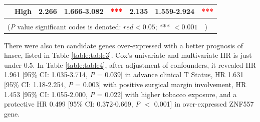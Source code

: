 \documentclass[jpm,article,submit,moreauthors,pdftex]{Definitions/mdpi}
\begin{document}
\begin{table}[hp]
{\begin{tabular}{|l|l|l|l|l|l|l|l|}
\cline{2-8}
                                        & High                                                                                & 2.266                                                                          & 1.666-3.082                                                                   & \multicolumn{1}{c|}{\textcolor{red}{***}}                                     & 2.135                                                                          & 1.559-2.924                                                                   & \multicolumn{1}{c|}{\textcolor{red}{***}}                                      \\ 
\hline
\multicolumn{8}{|l|}{}                                                                                                                                                                                                                                                                                                                                                                                                                                                                                                                                                                                                           \\ 
\hline
\multicolumn{8}{|l|}{(\textit{P} value significant codes is denoted: $red<0.05$; *** $<0.001$~~)}                                                                                                                                                                                                                                                                                                                                                                                                                                                                                                                                           \\
\hline
\end{tabular}
}
\label{table:table2}
\end{table}




There were also ten candidate genes over-expressed with a better prognosis of \acrshort{hnscc}, listed in Table \ref{table:table3}. Cox's univariate and multivariate HR is just under 0.5.
In Table \ref{table:table4},
after adjustment of confounders, it revealed HR 1.961 [95\% CI: 1.035-3.714, \textit{P} = 0.039] in advance clinical T Status, HR 1.631 [95\% CI: 1.18-2.254, \textit{P} = 0.003] with positive surgical margin involvement, HR 1.453 [95\% CI: 1.055-2.000, \textit{P} = 0.022] with higher tobacco exposure, and a protective HR 0.499 [95\% CI: 0.372-0.669, \textit{P} $<$ 0.001] in over-expressed \acrshort{ZNF557} gene.
\end{document}
